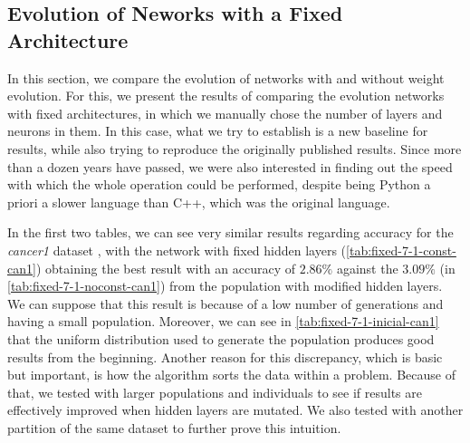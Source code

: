 \documentclass[runningheads]{llncs}
\begin{document}
\subsection{Evolution of Neworks with a Fixed Architecture}

In this section, we compare the evolution of networks with and without weight
evolution. For this, we present the results of comparing the evolution networks
with fixed architectures, in which we manually chose the number of layers and
neurons in them. In this case, what we try to establish is a new
baseline for results, while also trying to reproduce the originally
published results. Since more than a dozen years have passed, we were
also interested in finding out the speed with which the whole
operation could be performed, despite being Python a priori a slower
language than C++, which was the original language.

In the first two tables, we can see very similar results %
regarding accuracy for
the \emph{cancer1} dataset \cite{uci}, with the network with fixed hidden layers
(\autoref{tab:fixed-7-1-const-can1}) obtaining the best result with an accuracy
of $2.86\%$ against the $3.09\%$ (in \autoref{tab:fixed-7-1-noconst-can1}) from
the population with modified hidden layers. We can suppose that this result is
because of a low number of generations and having a small population. Moreover,
we can see in \autoref{tab:fixed-7-1-inicial-can1} that the uniform
distribution used to generate the population produces good results from the
beginning. Another reason for this discrepancy, which is basic but important, is
how the algorithm sorts the data within a problem. Because of that, we tested
with larger populations and individuals to see if results are effectively
improved when hidden layers are mutated. We also tested with another partition
of the same dataset to further prove this intuition.
\end{document}
